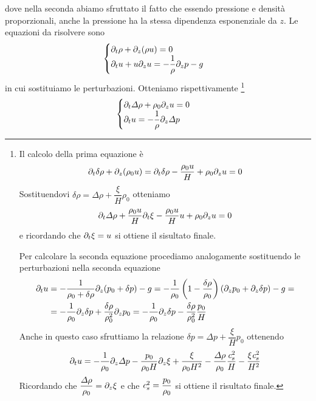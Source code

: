 dove nella seconda abiamo sfruttato il fatto che essendo pressione e densità proporzionali, anche la pressione ha la stessa dipendenza esponenziale da $z$.
Le equazioni da risolvere sono 
\begin{equation}
\begin{cases}
\partial_t \rho + \partial_z(\rho u) =0 \\	\label{eq:Sistema1}
\partial_t u + u \partial_z u = -\dfrac{1}{\rho} \partial_z p -g
\end{cases}
\end{equation}
in cui sostituiamo le perturbazioni. Otteniamo rispettivamente \footnote{Il calcolo della prima equazione è \begin{align*}
\partial_t \delta\rho + \partial_z (\rho_0 u)  = \partial_t \delta \rho - \dfrac{\rho_0 u}{H} + \rho_0 \partial_z u =0
\end{align*}
Sostituendovi $\delta\rho = \Delta\rho + \dfrac{\xi}{H}\rho_0$ otteniamo
\begin{align*}
\partial_t \Delta\rho + \dfrac{\rho_0 u}{H}\partial_t \xi -\dfrac{\rho_0 u}{H}u+ \rho_0 \partial_z u =0
\end{align*}
e ricordando che $\partial_t \xi = u$ si ottiene il sisultato finale.

Per calcolare la seconda equazione procediamo analogamente sostituendo le perturbazioni nella seconda equazione
\begin{align*}
\partial_t u &= -\dfrac{1}{\rho_0+\delta\rho}\partial_z (p_0+\delta p) -g = -\dfrac{1}{\rho_0}\left( 1- \dfrac{\delta\rho}{\rho_0} \right) \left( \partial_z p_0 + \partial_z \delta p \right) - g = \\
&= -\dfrac{1}{\rho_0} \partial_z \delta p + \dfrac{\delta \rho}{\rho_0^2}\partial_z p_0 = -\dfrac{1}{\rho_0} \partial_z \delta p - \dfrac{\delta \rho}{\rho_0^2} \dfrac{p_0}{H}  \\
\end{align*}
Anche in questo caso sfruttiamo la relazione $\delta p = \Delta p + \dfrac{\xi}{H}p_0$ ottenendo
\begin{align*}
\partial_t u = -\dfrac{1}{\rho_0} \partial_z \Delta p - \dfrac{p_0}{\rho_0 H} \partial_z \xi + \dfrac{\xi}{\rho_0 H^2} - \dfrac{\Delta \rho}{\rho_0} \dfrac{\textit{c}_{s}^2}{H} - \dfrac{\xi \textit{c}_{s}^2}{H^2}
\end{align*}
Ricordando che $\dfrac{\Delta \rho}{\rho_0} = \partial_z\xi$ e che $\textit{c}_{s}^2 = \dfrac{p_0}{\rho_0}$ si ottiene il risultato finale.
}
\begin{equation}
\begin{cases}
\partial_t \Delta \rho + \rho_0 \partial_z u =0 \\
\partial_t u = -\dfrac{1}{\rho} \partial_z \Delta p
\end{cases}
\end{equation}
